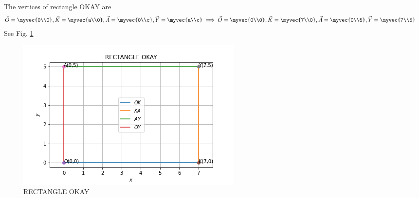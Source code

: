 The vertices of rectangle OKAY are
\begin{align}
\vec{O}&= \myvec{0\\0},\vec{K}= \myvec{a\\0},\vec{A}= \myvec{0\\c},\vec{Y}= \myvec{a\\c}
\implies \vec{O}= \myvec{0\\0},\vec{K}= \myvec{7\\0},\vec{A}= \myvec{0\\5},\vec{Y}= \myvec{7\\5}
\end{align}
See Fig.   \ref{sep/2/12/fig:RECTANGLE OKAY}
\begin{figure}[h!]
\includegraphics[width=\columnwidth]{solutions/sep/2/12/RECTANGLE.png}
  \caption{RECTANGLE OKAY }
  \label{sep/2/12/fig:RECTANGLE OKAY}
\end{figure}
